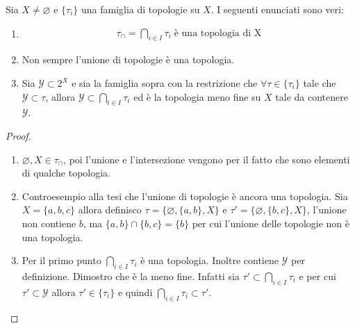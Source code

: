 \begin{proposition}
	Sia $X \neq \varnothing$ e $\{\tau_i\}$ una famiglia di topologie su $X$. I seguenti enunciati sono veri:
	\begin{enumerate}
		\item \begin{equation}
		\begin{aligned}
		\tau_\cap = \bigcap_{i \in I} \tau_i \; \text{è una topologia di X} 
		\end{aligned}
		\end{equation}
		\item Non sempre l'unione di topologie è una topologia.
		\item Sia $\mathcal{Y} \subset 2^X$ e sia la famiglia sopra con la restrizione che $\forall \tau \in \{\tau_i\}$ tale che $\mathcal{Y} \subset \tau$, allora $\mathcal{Y} \subset \bigcap_{i \in I} \tau_i $ ed è la topologia meno fine su $X$ tale da contenere $\mathcal{Y}$.
	\end{enumerate}
\end{proposition}
\begin{proof}
	\begin{enumerate}
		\item $\varnothing, X \in \tau_\cap$, poi l'unione e l'intersezione vengono per il fatto che sono elementi di qualche topologia.
		\item Controesempio alla tesi che l'unione di topologie è ancora una topologia. Sia $X = \{a,b,c\}$ allora definisco $\tau = \{\varnothing, \{a,b\}, X\}$ e $\tau' = \{\varnothing, \{b,c\}, X\}$, l'unione non contiene $b$, ma $\{a,b\} \cap \{b,c\} = \{b\}$ per cui l'unione delle topologie non è una topologia.
		\item Per il primo punto $\bigcap_{i \in I} \tau_i$ è una topologia. Inoltre contiene $\mathcal{Y}$ per definizione. Dimostro che è la meno fine. Infatti sia $\tau' \subset \bigcap_{i \in I} \tau_i$ e per cui $\tau' \subset \mathcal{Y}$ allora $\tau' \in \{\tau_i\}$ e quindi $\bigcap_{i \in I} \tau_i \subset \tau'$. 
	\end{enumerate}	
\end{proof}

